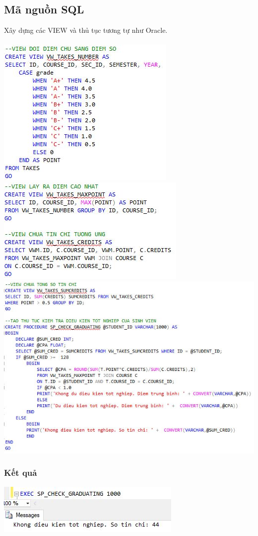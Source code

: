 \documentclass[12pt,a4paper]{report}
\begin{document}
\subsection{Mã nguồn SQL}
Xây dựng các VIEW và thủ tục tương tự như Oracle.\\\\
\includegraphics[scale=1]{b1s1.jpg}\\
\includegraphics[scale=1]{b1s2.jpg}\\
\includegraphics[scale=.9]{bts3.jpg}
\subsubsection{Kết quả}
\includegraphics[scale=1]{b1s.jpg}\\
\end{document}

